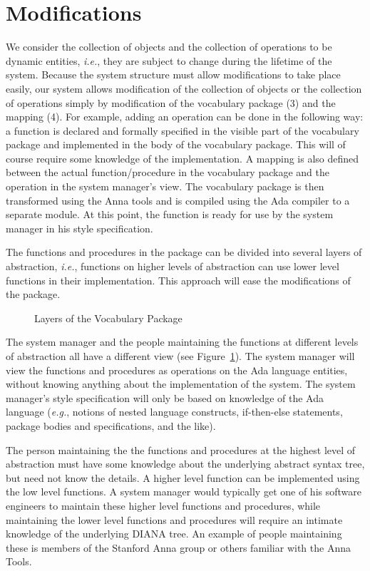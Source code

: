 \section{Modifications}
We consider the collection of objects and the collection of operations to
be dynamic entities, {\em i.e.}, they are subject to change during the lifetime of
the system. Because the system structure must allow modifications to take place 
easily, our system
allows modification of the collection of 
objects or the collection of operations simply 
by modification of the vocabulary package (3) and the mapping (4).
For example, adding an operation can be done in the following way: a function is 
declared and formally specified in the visible part of the vocabulary package
and implemented in the body of the vocabulary package. This will of course 
require some 
knowledge of the implementation. A mapping is also defined between the 
actual function/procedure in the vocabulary package and the operation
in the system manager's view. The vocabulary package is then transformed
using the Anna tools and is compiled using the Ada compiler to a 
separate module. At this point, the function is ready
for use by the system manager in his style specification.

The functions and procedures in the package can be divided into several
layers of abstraction, {\em i.e.}, functions on higher levels of abstraction
can use lower level functions in their implementation. This approach will
ease the modifications of the package.

\begin{figure}[htbp]

\vspace{1.9in}


\caption{Layers of the Vocabulary Package}\label{Layers}

\end{figure}

The system manager and the people maintaining the functions at different
levels of abstraction all have a different view (see Figure~\ref{Layers}). The
system manager will view the functions and procedures as operations on
the Ada language entities, without knowing anything about the implementation
of the system. The system manager's style specification will only be based 
on knowledge of the Ada language ({\em e.g.}, notions of nested language 
constructs, if-then-else statements, package bodies and specifications, and the
like).

The person maintaining the the functions and procedures at the highest level 
of abstraction must have some knowledge about the underlying abstract
syntax tree, but need not know the details. A higher level function can
be implemented using the low level functions. A system manager would
 typically get one of his software engineers to maintain these higher level
functions and procedures, while
maintaining the lower level functions and procedures will require an intimate
knowledge of the underlying DIANA tree. An example of people maintaining
these is members of the Stanford Anna group or others familiar with the Anna
Tools.
